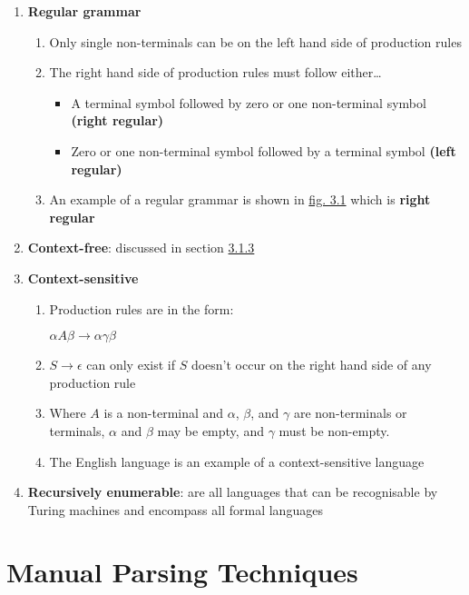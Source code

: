 \begin{enumerate}
    \item \textbf{Regular grammar}
    \begin{enumerate}
        \item Only single non-terminals can be on the left hand side of production rules
        \item The right hand side of production rules must follow either\dots
        \begin{itemize}
            \item A terminal symbol followed by zero or one non-terminal symbol \textbf{(right regular)}
            \item Zero or one non-terminal symbol followed by a terminal symbol \textbf{(left regular)}
        \end{itemize}
        \item An example of a regular grammar is shown in \hyperref[fig:3.1]{fig. 3.1} which is \textbf{right regular}
    \end{enumerate}
    \item \textbf{Context-free}: discussed in section \hyperref[sec:features-context-free]{3.1.3}
    \item \textbf{Context-sensitive}
    \begin{enumerate}
        \item Production rules are in the form:
        \begin{center}
            $\alpha A \beta \rightarrow \alpha \gamma \beta$
        \end{center}
        \item $S \rightarrow \epsilon$ can only exist if $S$ doesn't occur on the right hand side of any production rule
        \item Where $A$ is a non-terminal and $\alpha$, $\beta$, and $\gamma$ are non-terminals or terminals, $\alpha$ and $\beta$ may be empty, and $\gamma$ must be non-empty.
        \item The English language is an example of a context-sensitive language
    \end{enumerate}
    \item \textbf{Recursively enumerable}: are all languages that can be recognisable by Turing machines and encompass all formal languages\textsuperscript{\cite{geuvers_rot_2016}}
\end{enumerate}

\pagebreak

\section{Manual Parsing Techniques}

